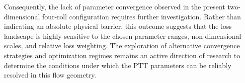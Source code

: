 Consequently, the lack of parameter convergence observed in the present two-dimensional
four-roll configuration requires further investigation. Rather than indicating
an absolute physical barrier, this outcome suggests that the loss landscape is highly
sensitive to the chosen parameter ranges, non-dimensional scales, and relative loss
weighting. The exploration of alternative convergence strategies and optimization regimes
remains an active direction of research to determine the conditions under which the
PTT parameters can be reliably resolved in this flow geometry.
